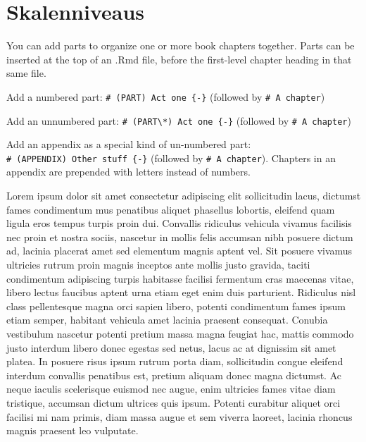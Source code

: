 \documentclass[
  oneside]{book}
\theoremstyle{definition}
\theoremstyle{definition}
\theoremstyle{definition}
\theoremstyle{definition}
\theoremstyle{remark}
\begin{document}
\hypertarget{skalenniveaus-2}{%
\chapter{Skalenniveaus}\label{skalenniveaus-2}}

You can add parts to organize one or more book chapters together. Parts can be inserted at the top of an .Rmd file, before the first-level chapter heading in that same file.

Add a numbered part: \texttt{\#\ (PART)\ Act\ one\ \{-\}} (followed by \texttt{\#\ A\ chapter})

Add an unnumbered part: \texttt{\#\ (PART\textbackslash{}*)\ Act\ one\ \{-\}} (followed by \texttt{\#\ A\ chapter})

Add an appendix as a special kind of un-numbered part: \texttt{\#\ (APPENDIX)\ Other\ stuff\ \{-\}} (followed by \texttt{\#\ A\ chapter}). Chapters in an appendix are prepended with letters instead of numbers.

Lorem ipsum dolor sit amet consectetur adipiscing elit sollicitudin lacus, dictumst fames condimentum mus penatibus aliquet phasellus lobortis, eleifend quam ligula eros tempus turpis proin dui. Convallis ridiculus vehicula vivamus facilisis nec proin et nostra sociis, nascetur in mollis felis accumsan nibh posuere dictum ad, lacinia placerat amet sed elementum magnis aptent vel. Sit posuere vivamus ultricies rutrum proin magnis inceptos ante mollis justo gravida, taciti condimentum adipiscing turpis habitasse facilisi fermentum cras maecenas vitae, libero lectus faucibus aptent urna etiam eget enim duis parturient. Ridiculus nisl class pellentesque magna orci sapien libero, potenti condimentum fames ipsum etiam semper, habitant vehicula amet lacinia praesent consequat. Conubia vestibulum nascetur potenti pretium massa magna feugiat hac, mattis commodo justo interdum libero donec egestas sed netus, lacus ac at dignissim sit amet platea. In posuere risus ipsum rutrum porta diam, sollicitudin congue eleifend interdum convallis penatibus est, pretium aliquam donec magna dictumst. Ac neque iaculis scelerisque euismod nec augue, enim ultricies fames vitae diam tristique, accumsan dictum ultrices quis ipsum. Potenti curabitur aliquet orci facilisi mi nam primis, diam massa augue et sem viverra laoreet, lacinia rhoncus magnis praesent leo vulputate.
\end{document}
